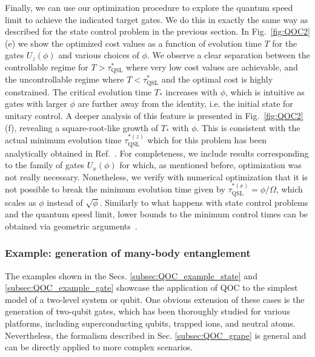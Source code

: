 Finally, we can use our optimization procedure to explore the quantum speed limit to achieve the indicated target gates. We do this in exactly the same way as described for the state control problem in the previous section. In Fig.~\ref{fig:QOC2}(e) we show the optimized cost values as a function of evolution time $T$ for the gates $U_z(\phi)$ and various choices of $\phi$. We observe a clear separation between the controllable regime for $T>\tau_{\text{QSL}}^\ast$ where very low cost values are achievable, and the uncontrollable regime where $T<\tau_{\text{QSL}}^\ast$ and the optimal cost is highly constrained. The critical evolution time $T_*$ increases with $\phi$, which is intuitive as gates with larger $\phi$ are further away from the identity, i.e. the initial state for unitary control. A deeper analysis of this feature is presented in Fig.~\ref{fig:QOC2}(f), revealing a  square-root-like growth of $T_*$ with $\phi$. This is consistent with the actual minimum evolution time $\tau_{\text{QSL}}^{*(z)}$ which for this problem has been analytically obtained in Ref.~\cite{boozer2012}. For completeness, we include results corresponding to the family of gates $U_x(\phi)$ for which, as mentioned before, optimization was not really necessary. Nonetheless, we verify with numerical optimization that it is not possible to break the minimum evolution time given by $\tau_{\text{QSL}}^{*(x)} = \phi/\Omega$, which scales as $\phi$ instead of $\sqrt{\phi}$. Similarly to what happens with state control problems and the quantum speed limit, lower bounds to the minimum control times can be obtained via geometric arguments~\cite{poggi2019geometric}.

\subsubsection{Example: generation of many-body entanglement}



The examples shown in the Secs. \ref{subsec:QOC_example_state} and \ref{subsec:QOC_example_gate} showcase the application of QOC to the simplest model of a two-level system or qubit.  One obvious extension of these cases is the generation of two-qubit gates, which has been thoroughly studied for various platforms, including superconducting qubits, trapped ions, and neutral atoms. Nevertheless, the formalism described in Sec. \ref{subsec:QOC_grape} is general and can be directly applied to more complex scenarios.\\

